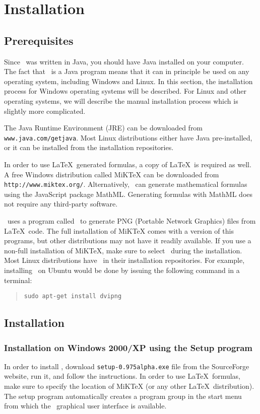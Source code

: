 \chapter{Installation}

\section{Prerequisites}
Since \oxdoc~was written in Java, you should have Java installed on your computer.  
The fact that \oxdoc~is a Java program means that it can in principle be used on 
any operating system, including Windows and Linux. In this section, the installation
process for Windows operating systems will be described. 
For Linux and other operating systems, we will describe the manual installation 
process which is slightly more complicated.

The Java Runtime Environment (JRE) can be downloaded from {\tt www.java.com/getjava}.
Most Linux distributions either have Java pre-installed, or it can be installed from
the installation repositories.

In order to use \LaTeX~generated formulas, a copy of \LaTeX~is required as well.
A free Windows distribution called MiKTeX can be downloaded from {\tt http://www.miktex.org/}.
Alternatively, \oxdoc~can generate mathematical formulas using the JavaScript package
MathML. Generating formulas with MathML does not require any third-party software. 

\oxdoc~uses a program called \dvipng~to generate PNG (Portable Network
Graphics) files from \LaTeX~code.  The full installation of MiKTeX comes with a version
of this programs, but other distributions may not have it readily available.  If you
use a non-full installation of MiKTeX, make sure to select \dvipng~during the
installation. Most Linux distributions have \dvipng~in their installation repositories. For
example, installing \dvipng~on Ubuntu would be done by issuing the following command in a terminal:
\begin{quote}
\tt sudo apt-get install dvipng
\end{quote}

\section{Installation}
\subsection{Installation on Windows 2000/XP using the Setup program}
In order to install \oxdoc, download {\tt setup-0.975alpha.exe} file from
the SourceForge website, run it, and follow the instructions.  
In order to use \LaTeX~formulas, make sure to specify the location of MiKTeX
(or any other \LaTeX~distribution).
The setup program automatically creates a program group in the start menu from
which the \oxdoc~graphical user interface is available. 

